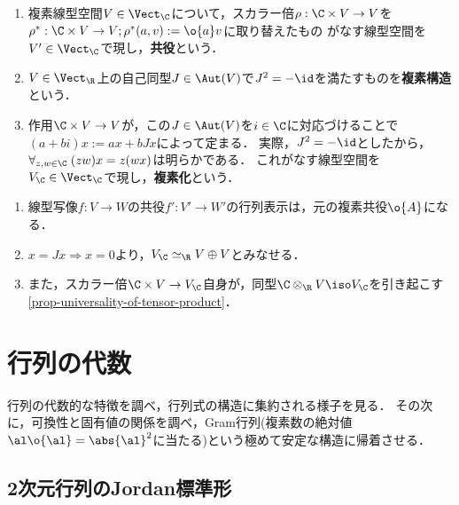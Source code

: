\documentclass[uplatex, dvipdfmx]{jsreport}
\begin{document}
\begin{definition}\mbox{}
    \begin{enumerate}
        \item 複素線型空間$V\in\Vect_\C$について，スカラー倍$\rho:\C\times V\to V$を$\rho^*:\C\times V\to V;\rho^*(a,v):=\o{a}v$に取り替えたもの
        がなす線型空間を$V'\in\Vect_\C$で現し，\textbf{共役}という．
        \item $V\in\Vect_\R$上の自己同型$J\in\Aut(V)$で$J^2=-\id$を満たすものを\textbf{複素構造}という．
        \item 作用$\C\times V\to V$が，この$J\in\Aut(V)$を$i\in\C$に対応づけることで$(a+bi)x:=ax+bJx$によって定まる．
        実際，$J^2=-\id$としたから，$\forall_{z,w\in\C}\;(zw)x=z(wx)$は明らかである．
        これがなす線型空間を$V_\C\in\Vect_\C$で現し，\textbf{複素化}という．
    \end{enumerate}
\end{definition}
\begin{remarks}\mbox{}
    \begin{enumerate}
        \item 線型写像$f:V\to W$の共役$f':V'\to W'$の行列表示は，元の複素共役$\o{A}$になる．
        \item $x=Jx\Rightarrow x=0$より，$V_\C\simeq_\R V\oplus V$とみなせる．
        \item また，スカラー倍$\C\times V\to V_\C$自身が，同型$\C\otimes_\R V\iso V_\C$を引き起こす\ref{prop-universality-of-tensor-product}．
    \end{enumerate}
\end{remarks}

\section{行列の代数}

\begin{tcolorbox}[colframe=ForestGreen, colback=ForestGreen!10!white,breakable,colbacktitle=ForestGreen!40!white,coltitle=black,fonttitle=\bfseries\sffamily,
title=]
    行列の代数的な特徴を調べ，行列式の構造に集約される様子を見る．
    その次に，可換性と固有値の関係を調べ，Gram行列(複素数の絶対値$\al\o{\al}=\abs{\al}^2$に当たる)という極めて安定な構造に帰着させる．
\end{tcolorbox}

\subsection{2次元行列のJordan標準形}
\end{document}
